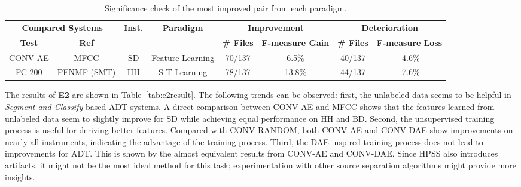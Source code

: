 \documentclass{article}
\newcommand{\comment}[1]{{\textcolor{blue}{#1}}}
\begin{document}
\begin{table}[t]
\centering
\begin{tabularx}{\textwidth}{cccccccc}
\hline
\multicolumn{2}{c}{\textbf{Compared Systems}} & \multirow{2}{*}{\textbf{Inst.}} & \multirow{2}{*}{\textbf{Paradigm}} & \multicolumn{2}{c}{\textbf{Improvement}}    & \multicolumn{2}{c}{\textbf{Deterioration}}  \\ \cline{1-2} \cline{5-8} 
\textbf{Test}          & \textbf{Ref}         &                                      &                                    & \textbf{\# Files} & \textbf{F-measure Gain} & \textbf{\# Files} & \textbf{F-measure Loss} \\ \hline
CONV-AE               & MFCC                 & SD                                   & Feature Learning                   & 70/137            & 6.5\%                   & 40/137            & -4.6\%                  \\
FC-200                & PFNMF (SMT)          & HH                                   & S-T Learning                       & 78/137            & 13.8\%                  & 44/137            & -7.6\%                  \\ \hline
\end{tabularx}%
\caption{Significance check of the most improved pair from each paradigm.}
\label{tab:improvCheck}
\end{table}

The results of \textbf{E2} are shown in Table~\ref{tab:e2result}. The following trends can be observed: first, the unlabeled data seems to be helpful in \textit{Segment and Classify}-based ADT systems. A direct comparison between CONV-AE and MFCC shows that the features learned from unlabeled data seem to slightly improve for SD while achieving equal performance on HH and BD. Second, the unsupervised training process is useful for deriving better features. Compared with CONV-RANDOM, both CONV-AE and CONV-DAE show improvements on nearly all instruments, indicating the advantage of the training process. Third, the DAE-inspired training process does not lead to improvements for ADT. This is shown by the almost equivalent results from CONV-AE and CONV-DAE. Since HPSS also introduces artifacts, it might not be the most ideal method for this task;  experimentation with other source separation algorithms might provide more insights. 
\end{document}
